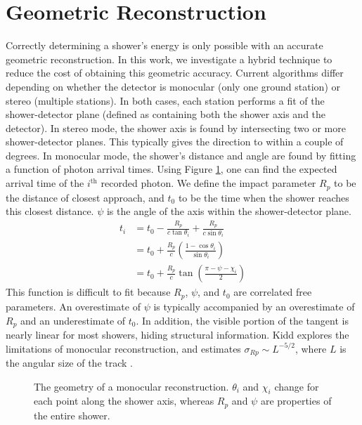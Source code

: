 \section{Geometric Reconstruction} \label{sec:intro_recon}

Correctly determining a shower's energy is only possible with an accurate geometric reconstruction. In this work, we investigate a hybrid technique to reduce the cost of obtaining this geometric accuracy. Current algorithms differ depending on whether the detector is monocular (only one ground station) or stereo (multiple stations). In both cases, each station performs a fit of the shower-detector plane (defined as containing both the shower axis and the detector). In stereo mode, the shower axis is found by intersecting two or more shower-detector planes. This typically gives the direction to within a couple of degrees. In monocular mode, the shower's distance and angle are found by fitting a function of  photon arrival times. Using Figure \ref{fig:mono}, one can find the expected arrival time of the $i^\text{th}$ recorded photon. We define the impact parameter $R_p$ to be the distance of closest approach, and $t_0$ to be the time when the shower reaches this closest distance. $\psi$ is the angle of the axis within the shower-detector plane.
\begin{equation} \label{eq:time_prof}
\begin{aligned}
    t_i &= t_0 - \frac{R_p}{c \tan{\theta_i}} + \frac{R_p}{c \sin{\theta_i}} \\[4pt]
        &= t_0 + \frac{R_p}{c} \left(\frac{1 - \cos{\theta_i}}{\sin{\theta_i}}\right) \\[4pt]
        &= t_0 + \frac{R_p}{c} \tan{\left(\frac{\pi - \psi - \chi_i}{2}\right)}
\end{aligned}
\end{equation}
This function is difficult to fit because $R_p$, $\psi$, and $t_0$ are correlated free parameters. An overestimate of $\psi$ is typically accompanied by an overestimate of $R_p$ and an underestimate of $t_0$. In addition, the visible portion of the tangent is nearly linear for most showers, hiding structural information. Kidd explores the limitations of monocular reconstruction, and estimates $\sigma_{Rp} \sim L^{-5/2}$, where $L$ is the angular size of the track \cite{kidd1997properties}.

\begin{figure}[ht]
    \label{fig:mono}
    \centering
    \caption{The geometry of a monocular reconstruction. $\theta_i$ and $\chi_i$ change for each point along the shower axis, whereas $R_p$ and $\psi$ are properties of the entire shower.}
\end{figure}

